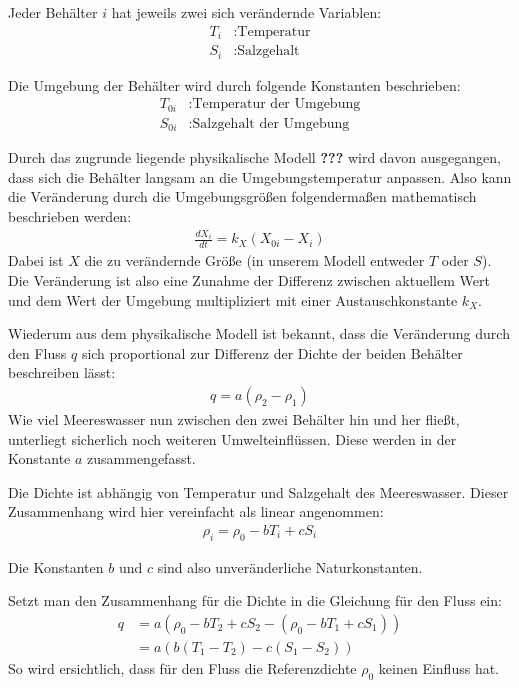 \documentclass[a4paper,twoside]{article}
\begin{document}
	Jeder Behälter \(i\) hat jeweils zwei sich verändernde Variablen:
	\begin{align*}
		T_i &: \textrm{Temperatur} \\
		S_i &: \textrm{Salzgehalt}
	\end{align*}
	
	Die Umgebung der Behälter wird durch folgende Konstanten beschrieben:
	\begin{align*}
		T_{0i} &: \textrm{Temperatur der Umgebung} \\
		S_{0i} &: \textrm{Salzgehalt der Umgebung}
	\end{align*}
	
	Durch das zugrunde liegende physikalische Modell \textbf{???} wird davon ausgegangen, dass sich die Behälter langsam an die Umgebungstemperatur anpassen. Also kann die Veränderung durch die Umgebungsgrößen folgendermaßen mathematisch beschrieben werden:
	\begin{align*}
		\frac{dX_i}{dt} = k_X \left( X_{0i} - X_i \right)
	\end{align*}
	Dabei ist \(X\) die zu verändernde Größe (in unserem Modell entweder \(T\) oder \(S\)).
	Die Veränderung ist also eine Zunahme der Differenz zwischen aktuellem Wert und dem Wert der Umgebung multipliziert mit einer Austauschkonstante \(k_X\).
	
	Wiederum aus dem physikalische Modell ist bekannt, dass die Veränderung durch den Fluss \(q\) sich proportional zur Differenz der Dichte der beiden Behälter beschreiben lässt:
	\begin{align*}
		q = a \left( \rho_2 - \rho_1 \right)
	\end{align*}
	Wie viel Meereswasser nun zwischen den zwei Behälter hin und her fließt, unterliegt sicherlich noch weiteren Umwelteinflüssen. Diese werden in der Konstante \(a\) zusammengefasst.
	
	Die Dichte ist abhängig von Temperatur und Salzgehalt des Meereswasser. Dieser Zusammenhang wird hier vereinfacht als linear angenommen:
	\begin{align*}
		\rho_i = \rho_0 - bT_i + cS_i
	\end{align*}
	
	Die Konstanten \(b\) und \(c\) sind also unveränderliche Naturkonstanten.
	
	Setzt man den Zusammenhang für die Dichte in die Gleichung für den Fluss ein:
	\begin{align*}
		q &= a \left( \rho_0 - bT_2 + cS_2 - \left( \rho_0 - bT_1 + cS_1 \right) \right) \\
		&= a \left( b\left( T_1 - T_2 \right) - c \left( S_1 - S_2 \right) \right)
	\end{align*}
	So wird ersichtlich, dass für den Fluss die Referenzdichte \(\rho_0\) keinen Einfluss hat.
	
\end{document}

